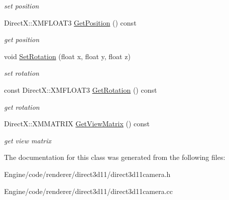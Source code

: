 \begin{DoxyCompactItemize}
\begin{DoxyCompactList}\small\item\em set position \end{DoxyCompactList}\item 
\mbox{\label{class_direct3_d11_1_1_direct3_d11_camera_a259cbe416eb23df8a5c2dd9f6e4a3b04}} 
Direct\+X\+::\+X\+M\+F\+L\+O\+A\+T3 \mbox{\hyperlink{class_direct3_d11_1_1_direct3_d11_camera_a259cbe416eb23df8a5c2dd9f6e4a3b04}{Get\+Position}} () const
\begin{DoxyCompactList}\small\item\em get position \end{DoxyCompactList}\item 
\mbox{\label{class_direct3_d11_1_1_direct3_d11_camera_a5eaf50254aa9703980fc12346f5b949b}} 
void \mbox{\hyperlink{class_direct3_d11_1_1_direct3_d11_camera_a5eaf50254aa9703980fc12346f5b949b}{Set\+Rotation}} (float x, float y, float z)
\begin{DoxyCompactList}\small\item\em set rotation \end{DoxyCompactList}\item 
\mbox{\label{class_direct3_d11_1_1_direct3_d11_camera_a4dca545bbcc6eb7e2cf04e90423da908}} 
const Direct\+X\+::\+X\+M\+F\+L\+O\+A\+T3 \mbox{\hyperlink{class_direct3_d11_1_1_direct3_d11_camera_a4dca545bbcc6eb7e2cf04e90423da908}{Get\+Rotation}} () const
\begin{DoxyCompactList}\small\item\em get rotation \end{DoxyCompactList}\item 
\mbox{\label{class_direct3_d11_1_1_direct3_d11_camera_ab09a6c67bfd24ddef916e18bd8cad9b0}} 
Direct\+X\+::\+X\+M\+M\+A\+T\+R\+IX \mbox{\hyperlink{class_direct3_d11_1_1_direct3_d11_camera_ab09a6c67bfd24ddef916e18bd8cad9b0}{Get\+View\+Matrix}} () const
\begin{DoxyCompactList}\small\item\em get view matrix \end{DoxyCompactList}\end{DoxyCompactItemize}


The documentation for this class was generated from the following files\+:\begin{DoxyCompactItemize}
\item 
Engine/code/renderer/direct3d11/direct3d11camera.\+h\item 
Engine/code/renderer/direct3d11/direct3d11camera.\+cc\end{DoxyCompactItemize}
